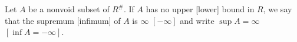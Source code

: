 Let $A$ be a nonvoid subset of $R^{\#}$. If $A$ has no upper [lower] bound in $R$, we say that the supremum [infimum] of $A$ is $\infty$ $[-\infty]$ and write $\sup A = \infty$ $[\inf A = -\infty]$.